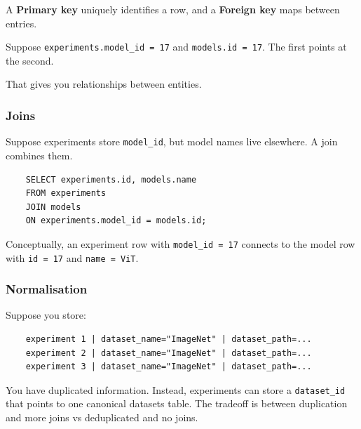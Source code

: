 A \textbf{Primary key} uniquely identifies a row, and a \textbf{Foreign key} maps between entries.

Suppose \texttt{experiments.model\_id = 17} and \texttt{models.id = 17}.
The first points at the second.

\begin{center}
\end{center}

That gives you relationships between entities.

\subsubsection{Joins}

Suppose experiments store \texttt{model\_id}, but model names live elsewhere.
A join combines them.

\begin{verbatim}
    SELECT experiments.id, models.name
    FROM experiments
    JOIN models
    ON experiments.model_id = models.id;
\end{verbatim}

Conceptually, an experiment row with \texttt{model\_id = 17} connects to the model row with \texttt{id = 17} and \texttt{name = ViT}.

\subsubsection{Normalisation}

Suppose you store:

\begin{verbatim}
    experiment 1 | dataset_name="ImageNet" | dataset_path=...
    experiment 2 | dataset_name="ImageNet" | dataset_path=...
    experiment 3 | dataset_name="ImageNet" | dataset_path=...
\end{verbatim}

You have duplicated information.
Instead, experiments can store a \texttt{dataset\_id} that points to one canonical datasets table.
The tradeoff is between duplication and more joins vs deduplicated and no joins.

